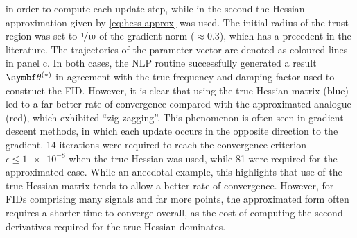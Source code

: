 in order to compute each update step, while in the second the Hessian
approximation given by \eqref{eq:hess-approx} was used. The initial
radius of the trust region was set to $\nicefrac{1}{10}$ of the gradient norm
($\approx 0.3$), which has a precedent in the literature\cite{Gould2005}. The
trajectories of the parameter vector are denoted as coloured lines in panel c.
In both cases, the \ac{NLP} routine successfully generated a result $\bthstar$
in agreement with the true frequency and damping factor used to construct the
\ac{FID}. However, it is clear that using the true Hessian matrix (blue)
led to a far better rate of convergence compared with the
approximated analogue (red), which exhibited ``zig-zagging''. This phenomenon
is often seen in gradient descent methods, in which each update occurs in the
opposite direction to the gradient.
14 iterations were required to reach the
convergence criterion $\epsilon \leq \num[print-unity-mantissa=false]{1e-8}$
when the true Hessian was used, while 81 were required for the approximated
case. While an anecdotal example, this highlights that use of the true
Hessian matrix tends to allow a better rate of convergence. However, for
\acp{FID} comprising many signals and far more points, the approximated form
often requires a shorter time to converge overall, as the cost of computing the
second derivatives required for the true Hessian dominates.

